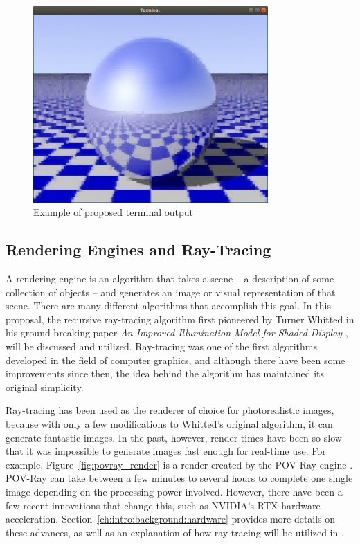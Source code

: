 \begin{figure}[htb]
  \centering
  \includegraphics[width=0.8\textwidth]{resources/checker_metal}
  \caption{Example of proposed terminal output}
  \label{fig:checker_metal}
\end{figure}

\subsection{Rendering Engines and Ray-Tracing}
\label{ch:intro:overview:raytracing}

A rendering engine is an algorithm that takes a scene -- a description of some collection of objects -- and generates an image or visual representation of that scene.
There are many different algorithms that accomplish this goal.
In this proposal, the recursive ray-tracing algorithm first pioneered by Turner Whitted in his ground-breaking paper {\it An Improved Illumination Model for Shaded Display} \cite{whitted1980improved}, will be discussed and utilized.
Ray-tracing was one of the first algorithms developed in the field of computer graphics, and although there have been some improvements since then, the idea behind the algorithm has maintained its original simplicity.

Ray-tracing has been used as the renderer of choice for photorealistic images, because with only a few modifications to Whitted's original algorithm, it can generate fantastic images.
In the past, however, render times have been so slow that it was impossible to generate images fast enough for real-time use.
For example, Figure~\ref{fig:povray_render} is a render created by the POV-Ray engine \cite{povray}.
POV-Ray can take between a few minutes to several hours to complete one single image depending on the processing power involved.
However, there have been a few recent innovations that change this, such as NVIDIA's RTX hardware acceleration.
Section~\ref{ch:intro:background:hardware} provides more details on these advances, as well as an explanation of how ray-tracing will be utilized in \name.

